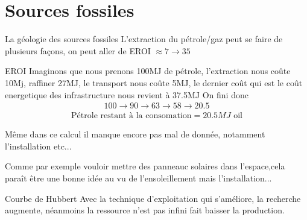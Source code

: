 \section{Sources fossiles}



\begin{parag}{La géologie des sources fossiles}
	L'extraction du pétrole/gaz peut se faire de plusieurs façons, on peut aller de EROI $\approx 7 \to 35$
    \begin{subparag}{EROI}
        Imaginons que nous prenons 100MJ de pétrole, l'extraction nous coûte 10Mj, raffiner 27MJ, le transport nous coûte 5MJ, le dernier coût qui est le coût energetique des infrastructure nous revient à 37.5MJ On fini donc
	\begin{align*} 100 \to 90 \to 63 \to 58 \to 20.5 \end{align*}
	\begin{align*} \text{Pétrole restant à la consomation} = 20.5MJ \text{ oil} \end{align*}
	\begin{framedremark}
	Même dans ce calcul il manque encore pas mal de donnée, notamment l'installation etc...
	\end{framedremark}
	\begin{framedremark}
	Comme par exemple vouloir mettre des panneauc solaires dans l'espace,cela paraît être une bonne idée au vu de l'ensoleillement mais l'installation...
	\end{framedremark}
    \end{subparag}
\end{parag}


\begin{parag}{Courbe de Hubbert}
    Avec la technique d'exploitation qui s'améliore, la recherche augmente, néanmoins la ressource n'est pas infini fait baisser la production.
\end{parag}

